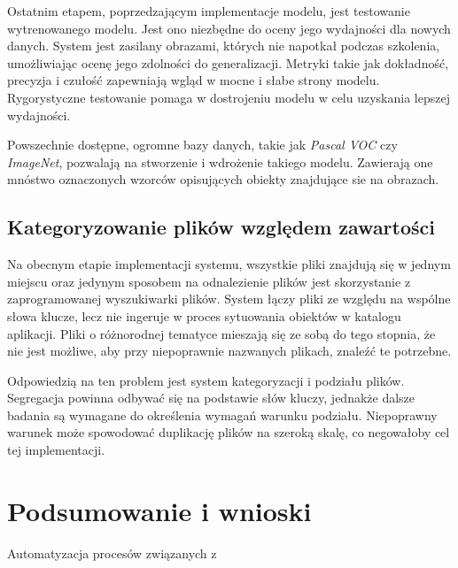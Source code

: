 \documentclass[12pt,a4paper,twoside]{article}
\begin{document}
Ostatnim etapem, poprzedzającym implementacje modelu, jest testowanie wytrenowanego modelu. Jest ono niezbędne do oceny jego wydajności dla nowych danych. System jest zasilany obrazami, których nie napotkał podczas szkolenia, umożliwiając ocenę jego zdolności do generalizacji. Metryki takie jak dokładność, precyzja i czułość zapewniają wgląd w mocne i słabe strony modelu. Rygorystyczne testowanie pomaga w dostrojeniu modelu w celu uzyskania lepszej wydajności.\par
Powszechnie dostępne, ogromne bazy danych, takie jak \textit{Pascal VOC} czy \textit{ImageNet}, pozwalają na stworzenie i wdrożenie takiego modelu. Zawierają one mnóstwo oznaczonych wzorców opisujących obiekty znajdujące sie na obrazach. 
\subsection{Kategoryzowanie plików względem zawartości}
Na obecnym etapie implementacji systemu, wszystkie pliki znajdują się w jednym miejscu oraz jedynym sposobem na odnalezienie plików jest skorzystanie z zaprogramowanej wyszukiwarki plików. System łączy pliki ze względu na wspólne słowa klucze, lecz nie ingeruje w proces sytuowania obiektów w katalogu aplikacji. Pliki o różnorodnej tematyce mieszają się ze sobą do tego stopnia, że nie jest możliwe, aby przy niepoprawnie nazwanych plikach, znaleźć te potrzebne. \par
Odpowiedzią na ten problem jest system kategoryzacji i podziału plików. Segregacja powinna odbywać się na podstawie słów kluczy, jednakże dalsze badania są wymagane do określenia wymagań warunku podziału. Niepoprawny warunek może spowodować duplikację plików na szeroką skalę, co negowałoby cel tej implementacji.
\section*{Podsumowanie i wnioski}
Automatyzacja procesów związanych z 
\newpage
\listoffigures
{}


\end{document}
